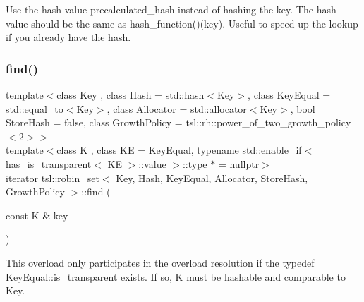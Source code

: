 Use the hash value \textquotesingle{}precalculated\+\_\+hash\textquotesingle{} instead of hashing the key. The hash value should be the same as hash\+\_\+function()(key). Useful to speed-\/up the lookup if you already have the hash. \mbox{\label{classtsl_1_1robin__set_ab715840532a8616bed9a39f9d92b3b17}} 
\subsubsection{\texorpdfstring{find()}{find()}\hspace{0.1cm}{\footnotesize\ttfamily [3/6]}}
{\footnotesize\ttfamily template$<$class Key , class Hash  = std\+::hash$<$\+Key$>$, class Key\+Equal  = std\+::equal\+\_\+to$<$\+Key$>$, class Allocator  = std\+::allocator$<$\+Key$>$, bool Store\+Hash = false, class Growth\+Policy  = tsl\+::rh\+::power\+\_\+of\+\_\+two\+\_\+growth\+\_\+policy$<$2$>$$>$ \\
template$<$class K , class KE  = Key\+Equal, typename std\+::enable\+\_\+if$<$ has\+\_\+is\+\_\+transparent$<$ K\+E $>$\+::value $>$\+::type $\ast$  = nullptr$>$ \\
iterator \mbox{\hyperlink{classtsl_1_1robin__set}{tsl\+::robin\+\_\+set}}$<$ Key, Hash, Key\+Equal, Allocator, Store\+Hash, Growth\+Policy $>$\+::find (\begin{DoxyParamCaption}\item[{const K \&}]{key }\end{DoxyParamCaption})\hspace{0.3cm}{\ttfamily [inline]}}

This overload only participates in the overload resolution if the typedef Key\+Equal\+::is\+\_\+transparent exists. If so, K must be hashable and comparable to Key. \mbox{\label{classtsl_1_1robin__set_a6252e181b2bb806733a5e45b90f67d35}} 
